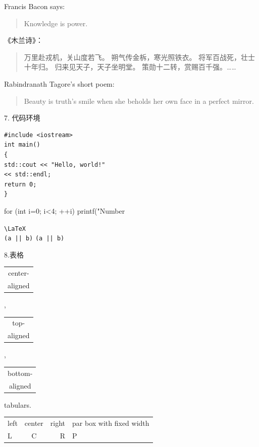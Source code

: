 \documentclass[12pt,UTF8]{ctexart}%
\begin{document}
Francis Bacon says:
\begin{quote}
Knowledge is power.
\end{quote}


《木兰诗》：
\begin{quotation}
万里赴戎机，关山度若飞。
朔气传金柝，寒光照铁衣。
将军百战死，壮士十年归。
归来见天子，天子坐明堂。
策勋十二转，赏赐百千强。……
\end{quotation}


Rabindranath Tagore's short poem:
\begin{verse}
Beauty is truth's smile
when she beholds her own face in
a perfect mirror.
\end{verse}

7. 代码环境\par

\begin{verbatim}
#include <iostream>
int main()
{
std::cout << "Hello, world!"
<< std::endl;
return 0;
}
\end{verbatim}

\begin{verbatim*}
for (int i=0; i<4; ++i)
printf("Number %
\end{verbatim*}


\verb|\LaTeX| \\
\verb+(a || b)+ \verb*+(a || b)+


8.表格\par

\begin{tabular}{|c|}
center-\\ aligned \\
\end{tabular},
\begin{tabular}[t]{|c|}
top-\\ aligned \\
\end{tabular},
\begin{tabular}[b]{|c|}
bottom-\\ aligned\\
\end{tabular} tabulars.\par

\par

\begin{tabular}{lcr|p{6em}}
\hline
left & center & right
& par box with fixed width\\
L & C & R & P \\
\hline
\end{tabular}\par
\end{document}
